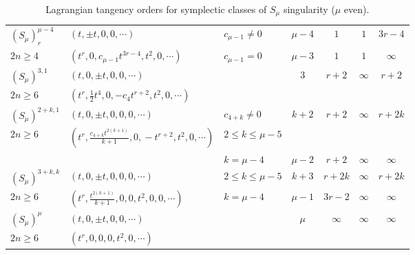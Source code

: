 \documentclass{amsart}
\theoremstyle{definition}
\numberwithin{equation}{section}
\begin{document}
\begin{center}
\begin{table}[h]
\begin{small}
\begin{tabular}{|p{1.3cm}|p{4.6cm}|p{2.3cm}|c|c|c|c|}
    $(S_{\mu})^{\mu-4}_r$  & $(t, \pm t,0, 0,\cdots)$ & $c_{\mu-1}\ne 0$  & $\mu\!-\!4$ & $1$ & $1$ & $3r\!-\!4$   \\ \cline{3-7}
 $2n\ge 4$  & $(t^r,0, c_{\mu-1}t^{3r-4}, t^2, 0,\cdots)$ & $c_{\mu-1}=0$ & $\mu\!-\!3$ &  $1$ & $1$ & $\infty$ \\   \hline

  $(S_{\mu})^{3,1}$  & $(t,0,\pm t,0, 0,\cdots)$ &   & $3$ & $r+2$ & $\infty$ & $r+2$   \\
 $2n\ge 6$  & $( t^r,\frac{1}{2}t^4,0,-c_4t^{r+2},t^2, 0,\cdots)$ &  &  &  &  &  \\ \hline

$(S_{\mu})^{2+\!k,1}$ & $(t,0,\pm t,0,0, 0, \cdots)$ & $c_{4+k}\ne 0$ & $k\!+\!2$ & $r+2$ & $\infty$ & $r\!+\!2k$ \\ 
    $2n\ge 6$ & $(\!t^r\!,\frac{c_{4+k}t^{2(k+1)}}{k+1},\!0,\!-t^{r\!+\!2}\!,t^2\!,\!0,\! \cdots)$ & $2\!\leq k \leq \mu\! -5$  &   &  &  &  \\ \cline{3-7}
      &     &   $k=\mu-4$ & $\mu\!-\!2$ &  $r+2$ & $\infty$ & $\infty$ \\   \hline

     $(S_{\mu})^{3+k,k}$ & $(t,0, \pm t,0,0, 0, \cdots)$ & $2\!\leq k \leq \mu\! -5$ & $\!k\!+3$ & $r\!+\!2k$ & $\infty$ & $r\!+\!2k$ \\ \cline{3-7}
    $2n\ge 6$ & $(t^{r},\frac{t^{2(k+1)}}{k+1}, 0, 0, t^2, 0, 0, \cdots)$ & $k=\mu-4$ & $\mu\!-\!1$ &  $3r-2$ & $\infty$ & $\infty$ \\   \hline

    $(S_{\mu})^{\mu}$  & $(t, 0,\pm t,0, 0,\cdots)$ &   & $\mu$ & $\infty$ & $\infty$ & $\infty$   \\ 
$2n\ge 6$  & $(t^r, 0, 0 , 0, t^2,0 ,\cdots)$ &  &  &  &  &  \\ \hline
\end{tabular}

\smallskip

\caption{\small Lagrangian tangency orders for symplectic classes of $S_{\mu}$ singularity ($\mu$ even).}\label{tabseven-lagr}

\end{small}
\end{table}
\end{center}

\medskip

\setlength{\tabcolsep}{1mm}
\end{document}
